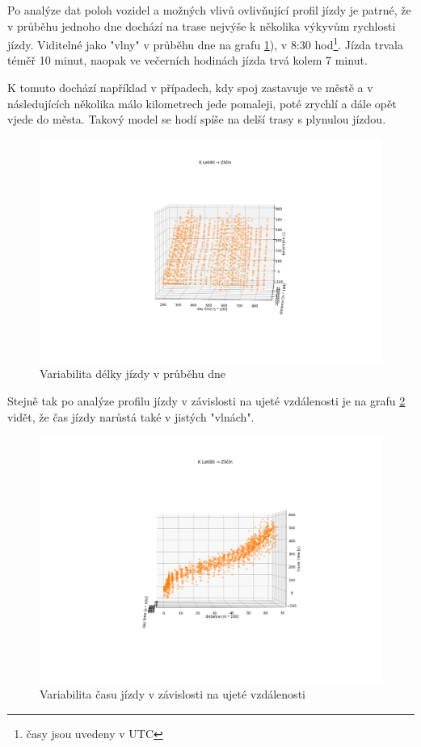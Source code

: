 Po analýze dat poloh vozidel a možných vlivů ovlivňující profil jízdy je patrné, že v průběhu jednoho dne dochází na trase nejvýše k několika výkyvům rychlosti jízdy. Viditelné jako "vlny" v průběhu dne na grafu \ref{fig:dojezd_ve_fazich_dne}), v 8:30 hod\footnote{časy jsou uvedeny v UTC}. Jízda trvala téměř 10 minut, naopak ve večerních hodinách jízda trvá kolem 7 minut.


\bigbreak


K tomuto dochází například v případech, kdy spoj zastavuje ve městě a v následujících několika málo kilometrech jede pomaleji, poté zrychlí a dále opět vjede do města. Takový model se hodí spíše na delší trasy s plynulou jízdou.


\begin{figure}
\centering
  \includegraphics[width=\linewidth]{../img/dojezd_ve_fazich_dne.png}
  \caption{Variabilita délky jízdy v průběhu dne}
  \label{fig:dojezd_ve_fazich_dne}
\end{figure}


Stejně tak po analýze profilu jízdy v závislosti na ujeté vzdálenosti je na grafu \ref{fig:dojezd_podle_vzdalenosti} vidět, že čas jízdy narůstá také v jistých "vlnách".


\begin{figure}
\centering
  \includegraphics[width=\linewidth]{../img/dojezd_podle_vzdalenosti.png}
  \caption{Variabilita času jízdy v závislosti na ujeté vzdálenosti}
  \label{fig:dojezd_podle_vzdalenosti}
\end{figure}


